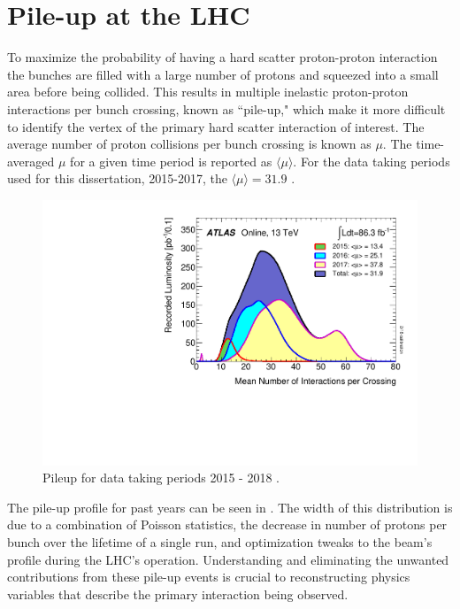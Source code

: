 \section{Pile-up at the LHC} \label{sec:lhc:pileup}

To maximize the probability of having a hard scatter proton-proton interaction
the bunches are filled with a large number of protons and squeezed into a small
area before being collided.  This results in multiple inelastic proton-proton
interactions per bunch crossing, known as ``pile-up," which make it more
difficult to identify the vertex of the primary hard scatter interaction of
interest.  The average number of proton collisions per bunch crossing is known
as $\mu$.  The time-averaged $\mu$ for a given time period is reported as
$\langle \mu \rangle$.  For the data taking periods used for this dissertation,
2015-2017, the $\langle \mu \rangle = 31.9$ \cite{LuminosityPublicResultsRun2}.

\begin{figure}[!htbp] 
  \begin{center}
    \includegraphics[width=0.9\linewidth]{figures/lhc/pileup.pdf}
    \caption{ Pileup for data taking periods 2015 - 2018 \cite{LuminosityPublicResultsRun2}.} 
    \label{fig:pileup} 
  \end{center} 
\end{figure}

The pile-up profile for past years can be seen in .  The width
of this distribution is due to a combination of Poisson statistics, the
decrease in number of protons per bunch over the lifetime of a single run, and
optimization tweaks to the beam's profile during the LHC's operation.
Understanding and eliminating the unwanted contributions from these pile-up
events is crucial to reconstructing physics variables that describe the primary
interaction being observed.
